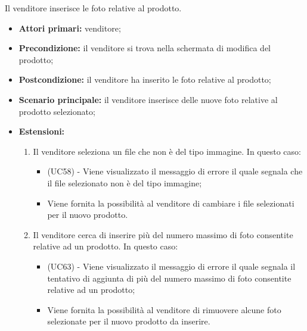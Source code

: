 Il venditore inserisce le foto relative al prodotto.
\begin{itemize}
    \item \textbf{Attori primari:} venditore;
    \item \textbf{Precondizione:} il venditore si trova nella schermata di modifica del prodotto;
    \item \textbf{Postcondizione:} il venditore ha inserito le foto relative al prodotto;
    \item \textbf{Scenario principale:} il venditore inserisce delle nuove foto relative al prodotto selezionato;
    \item \textbf{Estensioni:}
    \begin{enumerate}[label=\lett]
    	\item Il venditore seleziona un file che non è del tipo immagine. In questo caso:
		\begin{itemize}
			\item (UC58) - Viene visualizzato il messaggio di errore il quale segnala che il file selezionato non è del tipo immagine;
			\item Viene fornita la possibilità al venditore di cambiare i file selezionati per il nuovo prodotto.
		\end{itemize}
		\item Il venditore cerca di inserire più del numero massimo di foto consentite relative ad un prodotto. In questo caso:
		\begin{itemize}
			\item (UC63) - Viene visualizzato il messaggio di errore il quale segnala il tentativo di aggiunta di più del numero massimo di foto consentite relative ad un prodotto;
			\item Viene fornita la possibilità al venditore di rimuovere alcune foto selezionate per il nuovo prodotto da inserire.
		\end{itemize}
    \end{enumerate}
\end{itemize}

